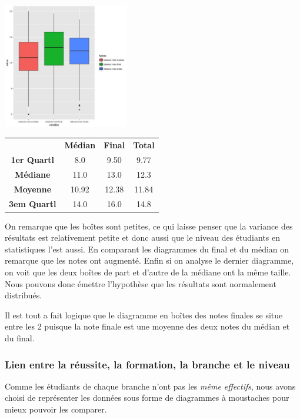 \documentclass[10pt]{article}
\begin{document}
	\begin{minipage}{.4\textwidth}	
		\includegraphics[width=55mm]{Figures/Notes/boxplot_exam.jpg}
		\label{fig:Boxplot_notes}
	\end{minipage}%
	\hspace{0.03\linewidth}
	\begin{minipage}{.6\textwidth}
		\begin{tabular}{ c c c c }
			\textbf{}       & \textbf{Médian} & \textbf{Final}   & \textbf{Total} \\
			\textbf{1er Quartl}    & 8.0 			       & 9.50		      & 9.77    \\
			\textbf{Médiane  }   &11.0		             & 13.0	            & 12.3    \\
			\textbf{Moyenne}     & 10.92                &  12.38          & 11.84\\
			\textbf{3em Quartl}  & 14.0  				& 16.0 		       & 14.8\\
		\end{tabular}
	\end{minipage}
	
	
	On remarque que les boîtes sont petites, ce qui laisse penser que la variance des résultats est relativement petite et donc aussi que le niveau des étudiants en statistiques l'est aussi.  En comparant les diagrammes du final et du médian on remarque que les notes ont augmenté.  Enfin si on analyse le dernier diagramme, on voit que les deux boîtes de part et d'autre de la médiane ont la même taille. Nous pouvons donc émettre l'hypothèse que les résultats sont normalement distribués. 
	
	Il est tout a fait logique que le diagramme en boîtes des notes finales se situe entre les 2 puisque la note finale est une moyenne des deux notes du médian et du final.
	
	
	\subsubsection{Lien entre la réussite, la formation, la branche et le niveau}
	Comme les étudiants de chaque branche n'ont pas les \textit{même effectifs}, nous avons choisi de représenter les données sous forme de diagrammes à moustaches pour mieux pouvoir les comparer.\\
	
\end{document}
